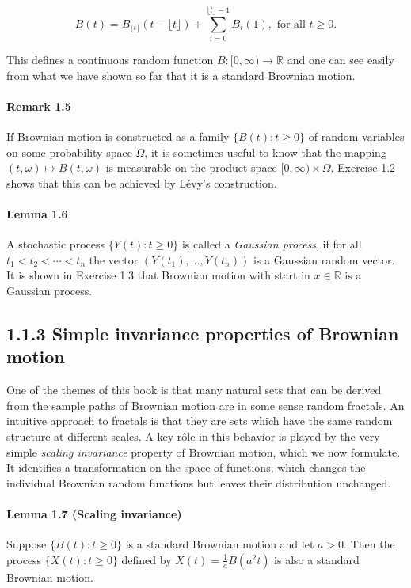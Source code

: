 \documentclass{article}
\begin{document}
\[
B(t) = B_{\lfloor t \rfloor}(t - \lfloor t \rfloor) + \sum_{i=0}^{\lfloor t \rfloor - 1} B_i(1), \text{ for all } t \geq 0.
\]

This defines a continuous random function $B : [0, \infty) \rightarrow \mathbb{R}$ and one can see easily from what we have shown so far that it is a standard Brownian motion.

\paragraph{Remark 1.5} If Brownian motion is constructed as a family $\{B(t) : t \geq 0\}$ of random variables on some probability space $\Omega$, it is sometimes useful to know that the mapping $(t, \omega) \mapsto B(t, \omega)$ is measurable on the product space $[0, \infty) \times \Omega$. Exercise 1.2 shows that this can be achieved by Lévy’s construction.

\paragraph{Lemma 1.6} A stochastic process $\{Y(t) : t \geq 0\}$ is called a \textit{Gaussian process}, if for all $t_1 < t_2 < \cdots < t_n$ the vector $(Y(t_1), \ldots, Y(t_n))$ is a Gaussian random vector. It is shown in Exercise 1.3 that Brownian motion with start in $x \in \mathbb{R}$ is a Gaussian process.

\subsection*{1.1.3 Simple invariance properties of Brownian motion}

One of the themes of this book is that many natural sets that can be derived from the sample paths of Brownian motion are in some sense random fractals. An intuitive approach to fractals is that they are sets which have the same random structure at different scales. A key rôle in this behavior is played by the very simple \textit{scaling invariance} property of Brownian motion, which we now formulate. It identifies a transformation on the space of functions, which changes the individual Brownian random functions but leaves their distribution unchanged.

\paragraph{Lemma 1.7 (Scaling invariance)} Suppose $\{B(t) : t \geq 0\}$ is a standard Brownian motion and let $a > 0$. Then the process $\{X(t) : t \geq 0\}$ defined by $X(t) = \frac{1}{a}B(a^2 t)$ is also a standard Brownian motion.
\end{document}
